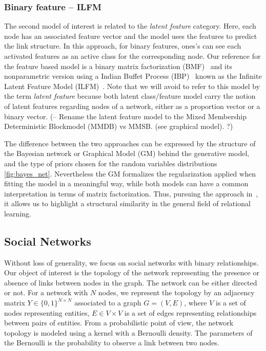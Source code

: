 \subsubsection{Binary feature -- ILFM}
The second model of interest is related to the \emph{latent feature} category. Here, each node has an associated feature vector and the model uses the features to predict the link structure. In this approach, for binary features, ones's can see each activated features as an active class for the corresponding node. Our reference for the feature based model is a binary matrix factorization  (BMF)~\cite{BMF} and its nonparametric version using a Indian Buffet Process (IBP)~\cite{IBP} known as the Infinite Latent Feature Model (ILFM)~\cite{ILFRM}.  Note that we will avoid to refer to this model by the term \emph{latent feature} because both latent class/feature model carry the notion of latent features regarding nodes of a network, either as a proportion vector or a binary vector.
(-- Rename the latent feature model to the Mixed Membership Deterministic Blockmodel (MMDB) vs MMSB. (see graphical model). ?)


The difference between the two approaches can be expressed by the structure of the Bayesian network or Graphical Model (GM) behind the generative model, and the type of priors chosen for the random variables distributions \ref{fig:bayes_net}. Nevertheless the GM formalizes the regularization applied when fitting the model in a meaningful way, while both models can have a common interpretation in terms of matrix factorization. Thus, pursuing the approach in~\cite{DCA}, it allows us to highlight a structural similarity in the general field of relational learning.

\subsection{Social Networks}
Without loss of generality, we focus on social networks with binary relationships. Our object of interest is the topology of the network representing the presence or absence of links between nodes in the graph. The network can be either directed or not. For a network with $N$ nodes, we represent the topology by an adjacency matrix $Y \in \{0,1\}^{N\times N}$ associated to a graph $G = (V,E)$, where $V$ is a set of nodes representing entities, $E \in V \times V$ is a set of edges representing relationships between pairs of entities. From a probabilistic point of view, the network topology is modeled using a kernel with a Bernoulli density. The parameters of the Bernoulli is the probability to observe a link between two nodes.

